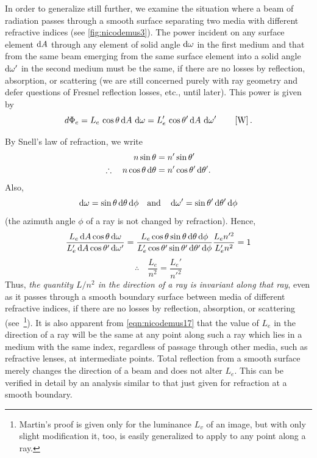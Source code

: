 In order to generalize still further, we examine the situation where a beam of
radiation passes through a smooth surface separating two media with different
refractive indices (see \cref{fig:nicodemus3}). The power incident on any
surface element $\mathop{}\!\mathrm{d} A$ through any element of solid angle $\mathop{}\!\mathrm{d} \omega$ in the first
medium and that from the same beam emerging from the same surface element into
a solid angle $\mathop{}\!\mathrm{d} \omega'$ in the second medium must be the same, if there are no
losses by reflection, absorption, or scattering (we are still concerned purely
with ray geometry and defer questions of Fresnel reflection losses, etc., until
later). This power is given by
\begin{equation}\label{eqn:nicodemus13}
d\Phi_e = L_e\,\cos\theta \mathop{}\!\mathrm{d} A\, \mathop{}\!\mathrm{d} \omega = L_e'\,\cos\theta' \mathop{}\!\mathrm{d} A\, \mathop{}\!\mathrm{d} \omega'
\qquad \left[\si{\watt}\right].
\end{equation}

By Snell's law of refraction, we write
\begin{align}
n\sin\theta &= n' \sin \theta' \\
\therefore\quad n\cos\theta \mathop{}\!\mathrm{d} \theta &= n' \cos\theta' \mathop{}\!\mathrm{d} \theta'.
\end{align}
Also,
\begin{equation}
\d\omega = \sin\theta\d\theta \d\phi
\quad \textrm{and} \quad
\d\omega' = \sin\theta'\d\theta' \d\phi
\end{equation}
(the azimuth angle $\phi$ of a ray is not changed by refraction). Hence,
\begin{equation*}
\frac{L_e \d A \cos\theta \d\omega}{L_e' \d A \cos\theta' \d\omega'} =
\frac{L_e \cos\theta \sin\theta \d\theta \d\phi}{L_e' \cos\theta' \sin\theta' \d\theta' \d\phi}
\frac{L_e n'^2}{L_e' n^2} = 1
\end{equation*}
\begin{equation}
\therefore\quad \frac{L_e}{n^2} = \frac{L_e'}{n'^2} \label{eqn:nicodemus17}
\end{equation}
Thus, \emph{the quantity $L / n^2$ in the direction of a ray is invariant along
that ray}, even as it passes through a smooth boundary surface between media of
different refractive indices, if there are no losses by reflection, absorption,
or scattering (see~\footnote{\label{note:nicodemus8__}Martin's proof is given
only for the luminance $L_v$ of an image, but with
only slight modification it, too, is easily generalized to apply to any
point along a ray.}). It is also apparent from \cref{eqn:nicodemus17}
that the value of $L_e$ in the direction of a ray will be the same at any
point along such a ray which lies in a medium with the same index, regardless
of passage through other media, such as refractive lenses, at intermediate
points.
Total reflection from a smooth surface merely changes the direction of a
beam and does not alter $L_e$. This can be verified in detail by an analysis
similar to that just given for refraction at a smooth boundary.

